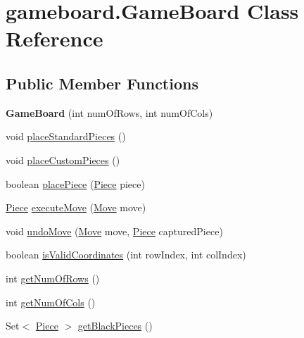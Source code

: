 \hypertarget{classgameboard_1_1_game_board}{}\section{gameboard.\+Game\+Board Class Reference}
\label{classgameboard_1_1_game_board}
\subsection*{Public Member Functions}
\begin{DoxyCompactItemize}
\item 
\mbox{\label{classgameboard_1_1_game_board_a2744a1969fe37986c4026beec995adec}} 
{\bfseries Game\+Board} (int num\+Of\+Rows, int num\+Of\+Cols)
\item 
void \mbox{\hyperlink{classgameboard_1_1_game_board_a6e74eee1e3ec913341e6f440064d0f80}{place\+Standard\+Pieces}} ()
\item 
void \mbox{\hyperlink{classgameboard_1_1_game_board_ae7f2394074cc527b4ed933d562f08f06}{place\+Custom\+Pieces}} ()
\item 
boolean \mbox{\hyperlink{classgameboard_1_1_game_board_aee63d4310ef2ea7cb177013eed310b40}{place\+Piece}} (\mbox{\hyperlink{classpieces_1_1_piece}{Piece}} piece)
\item 
\mbox{\hyperlink{classpieces_1_1_piece}{Piece}} \mbox{\hyperlink{classgameboard_1_1_game_board_a368adac08213b4311a2897a273acc118}{execute\+Move}} (\mbox{\hyperlink{classpieces_1_1_move}{Move}} move)
\item 
void \mbox{\hyperlink{classgameboard_1_1_game_board_a82442fc13c1a73e107851235c5cd92a2}{undo\+Move}} (\mbox{\hyperlink{classpieces_1_1_move}{Move}} move, \mbox{\hyperlink{classpieces_1_1_piece}{Piece}} captured\+Piece)
\item 
boolean \mbox{\hyperlink{classgameboard_1_1_game_board_ad7fb7cf5cb3b97770bfaf5c595c5630b}{is\+Valid\+Coordinates}} (int row\+Index, int col\+Index)
\item 
int \mbox{\hyperlink{classgameboard_1_1_game_board_a6b108da59e192efeb24937121ff160ba}{get\+Num\+Of\+Rows}} ()
\item 
int \mbox{\hyperlink{classgameboard_1_1_game_board_a049d4164c15b7a60f23b12accd0c1e15}{get\+Num\+Of\+Cols}} ()
\item 
Set$<$ \mbox{\hyperlink{classpieces_1_1_piece}{Piece}} $>$ \mbox{\hyperlink{classgameboard_1_1_game_board_a6dbc8479a689353cfde617056007b5f1}{get\+Black\+Pieces}} ()

\end{DoxyCompactItemize}
